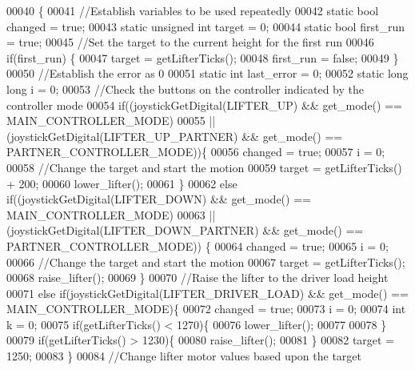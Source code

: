 \begin{DoxyCode}
00040                      \{
00041   \textcolor{comment}{//Establish variables to be used repeatedly}
00042   \textcolor{keyword}{static} \textcolor{keywordtype}{bool} changed = \textcolor{keyword}{true};
00043   \textcolor{keyword}{static} \textcolor{keywordtype}{unsigned} \textcolor{keywordtype}{int} target = 0;
00044   \textcolor{keyword}{static} \textcolor{keywordtype}{bool} first\_run = \textcolor{keyword}{true};
00045   \textcolor{comment}{//Set the target to the current height for the first run}
00046   \textcolor{keywordflow}{if}(first\_run) \{
00047     target = getLifterTicks();
00048     first\_run = \textcolor{keyword}{false};
00049   \}
00050   \textcolor{comment}{//Establish the error as 0}
00051   \textcolor{keyword}{static} \textcolor{keywordtype}{int} last\_error = 0;
00052   \textcolor{keyword}{static} \textcolor{keywordtype}{long} \textcolor{keywordtype}{long} i = 0;
00053   \textcolor{comment}{//Check the buttons on the controller indicated by the controller mode}
00054   \textcolor{keywordflow}{if}((joystickGetDigital(LIFTER_UP) && get_mode() == MAIN_CONTROLLER_MODE)
00055    || (joystickGetDigital(LIFTER_UP_PARTNER) && get_mode() == 
      PARTNER_CONTROLLER_MODE))\{
00056     changed = \textcolor{keyword}{true};
00057     i = 0;
00058     \textcolor{comment}{//Change the target and start the motion}
00059     target = getLifterTicks() + 200;
00060     lower_lifter();
00061   \}
00062   \textcolor{keywordflow}{else} \textcolor{keywordflow}{if}((joystickGetDigital(LIFTER_DOWN) && get_mode() == MAIN_CONTROLLER_MODE)
00063    || (joystickGetDigital(LIFTER_DOWN_PARTNER) && get_mode() == 
      PARTNER_CONTROLLER_MODE)) \{
00064     changed = \textcolor{keyword}{true};
00065     i = 0;
00066     \textcolor{comment}{//Change the target and start the motion}
00067     target = getLifterTicks();
00068     raise_lifter();
00069   \}
00070   \textcolor{comment}{//Raise the lifter to the driver load height}
00071   \textcolor{keywordflow}{else} \textcolor{keywordflow}{if}(joystickGetDigital(LIFTER_DRIVER_LOAD) && get_mode() == 
      MAIN_CONTROLLER_MODE)\{
00072     changed = \textcolor{keyword}{true};
00073     i = 0;
00074     \textcolor{keywordtype}{int} k = 0;
00075     \textcolor{keywordflow}{if}(getLifterTicks() < 1270)\{
00076       lower_lifter();
00077 
00078     \}
00079     \textcolor{keywordflow}{if}(getLifterTicks() > 1230)\{
00080       raise_lifter();
00081     \}
00082     target = 1250;
00083   \}
00084   \textcolor{comment}{//Change lifter motor values based upon the target}

\end{DoxyCode}
